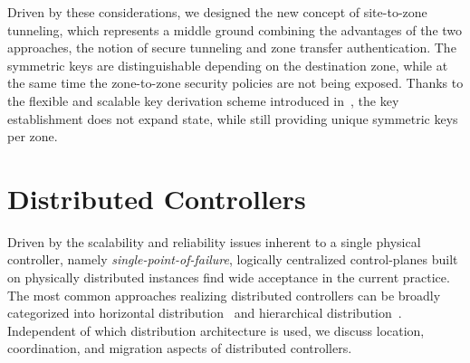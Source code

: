 Driven by these considerations, we designed the new concept of site-to-zone tunneling,
which represents a middle ground combining the advantages of the two approaches, the 
notion of secure tunneling and zone transfer authentication. The symmetric keys
are distinguishable depending on the destination zone, while at the same time the
zone-to-zone security policies are not being exposed. Thanks to the flexible and scalable key derivation scheme introduced in~\cite{rot2020piskes}, the key establishment does not expand
state, while still providing unique symmetric keys per zone.




\section{Distributed Controllers}
\label{sec:distributedcontroller}
Driven by the scalability and reliability issues inherent to a single physical controller, 
namely \textit{single-point-of-failure}, logically centralized control-planes built on 
physically distributed instances find wide acceptance in the current practice. The most 
common approaches realizing distributed controllers can be broadly categorized into 
horizontal distribution~\cite{berde2014onos,medved2014opendaylight} and hierarchical 
distribution~\cite{hassas2012kandoo,yap2017taking}. Independent of which distribution 
architecture is used, we discuss location, coordination, and migration aspects of distributed
controllers.

